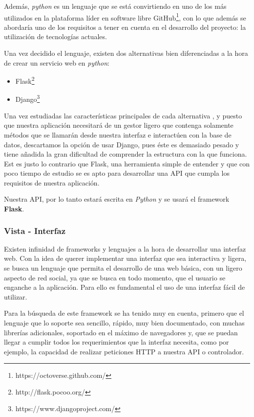 Además, \textit{python} es un lenguaje que se está convirtiendo en uno de los más utilizados en la plataforma líder en software libre GitHub\footnote{https://octoverse.github.com/}, con lo que además se abordaría uno de los requisitos a tener en cuenta en el desarrollo del proyecto: la utilización de tecnologías actuales.

Una vez decidido el lenguaje, existen dos alternativas bien diferenciadas a la hora de crear un servicio web en \textit{python}:

\begin{itemize}
    \item Flask\footnote{http://flask.pocoo.org/}
    \item Django\footnote{https://www.djangoproject.com/}
\end{itemize}

Una vez estudiadas las características principales de cada alternativa\cite{flaskvsdjango1} , y puesto que nuestra aplicación necesitará de un gestor ligero que contenga solamente métodos que se llamarán desde nuestra interfaz e interactúen con la base de datos, descartamos la opción de usar Django, pues éste es demasiado pesado y tiene añadida la gran dificultad de comprender la estructura con la que funciona. Est es justo lo contrario que Flask, una herramienta simple de entender y que con poco tiempo de estudio se es apto para desarrollar una API que cumpla los requisitos de nuestra aplicación. 

Nuestra API, por lo tanto estará escrita en \textit{Python} y se usará el framework \textbf{Flask}.

\subsubsection{Vista - Interfaz}

Existen infinidad de frameworks y lenguajes a la hora de desarrollar una interfaz web. Con la idea de querer implementar una interfaz que sea interactiva y ligera, se busca un lenguaje que permita el desarrollo de una web básica, con un ligero aspecto de red social, ya que se busca en todo momento, que el usuario se enganche a la aplicación. Para ello es fundamental el uso de una interfaz fácil de utilizar.

Para la búsqueda de este framework se ha tenido muy en cuenta, primero que el lenguaje que lo soporte sea sencillo, rápido, muy bien documentado, con muchas librerías adicionales, soportado en el máximo de navegadores y, que se puedan llegar a cumplir todos los requerimientos que la interfaz necesita, como por ejemplo, la capacidad de realizar peticiones HTTP a nuestra API o controlador.

